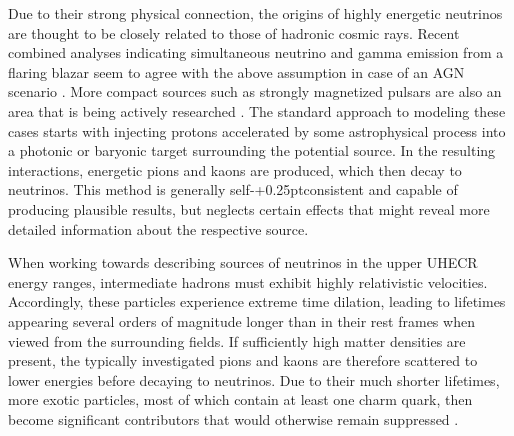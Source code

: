 Due to their strong physical connection, the origins of highly energetic neutrinos are thought to be closely related
to those of hadronic cosmic rays. Recent combined analyses indicating simultaneous neutrino and gamma emission from a
flaring blazar seem to agree with the above assumption in case of an AGN scenario \cite{ic_blazar_flare, ic_blazar_signal}.
More compact sources such as strongly magnetized pulsars are also an area that is being actively researched \cite{Murase_2009}.
The standard approach to modeling these cases starts with injecting protons accelerated by some astrophysical process into
a photonic or baryonic target surrounding the potential source. In the resulting interactions, energetic pions and kaons are
produced, which then decay to neutrinos. This method is generally self-{\kern+0.25pt}consistent and capable of producing
plausible results, but neglects certain effects that might reveal more detailed information about the respective source.

When working towards describing sources of neutrinos in the upper UHECR energy ranges, intermediate hadrons must exhibit
highly relativistic velocities. Accordingly, these particles experience extreme time dilation, leading to lifetimes
appearing several orders of magnitude longer than in their rest frames when viewed from the surrounding fields.
If sufficiently high matter densities are present, the typically investigated pions and kaons are therefore scattered
to lower energies before decaying to neutrinos. Due to their much shorter lifetimes, more exotic particles, most of which
contain at least one charm quark, then become significant contributors that would otherwise remain suppressed \cite{Tjus_2023}.


